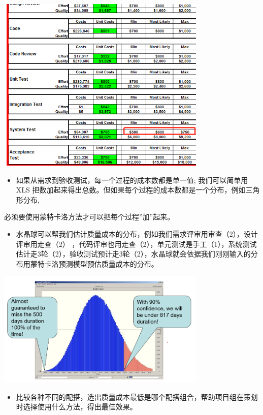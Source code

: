 \includegraphics[width=10cm]{微信截图_20211027012006.png}

\begin{itemize}
\tightlist
\item
  如果从需求到验收测试，每一个过程的成本数都是单一值; 我们可以简单用 XLS
  把数加起来得出总数。但如果每个过程的成本数都是一个分布，例如三角形分布,
\end{itemize}

必须要使用蒙特卡洛方法才可以把每个过程''加''起来。

\begin{itemize}
\tightlist
\item
  水晶球可以帮我们估计质量成本的分布，例如我们需求评审用审查（2），设计评审用走查（2）
  ，代码评审也用走查（2），单元测试是手工（1），系统测试估计走3轮（2），验收测试预计走3轮（2），水晶球就会依据我们刚刚输入的分布用蒙特卡洛预测模型预估质量成本的分布。
\end{itemize}


\includegraphics[width=10cm]{HmttDistScreenshot_2021-10-08_165836.png}

\begin{itemize}
\tightlist
\item
  比较各种不同的配搭，选出质量成本最低是哪个配搭组合，帮助项目组在策划时选择使用什么方法，得出最佳效果。
\end{itemize}

